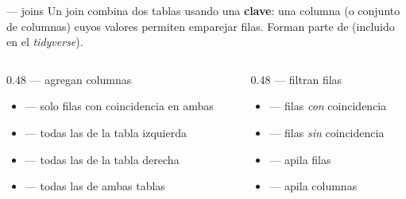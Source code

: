 \documentclass[8pt]{beamer}
\begin{document}
	\subtitle{Cheatsheet de \emph{joins} en R}

	\begin{frame}[plain]
		\maketitle
	\end{frame}

	\begin{frame}{ — joins}
		Un join combina dos tablas usando una \textbf{clave}: una columna (o conjunto de columnas) cuyos valores permiten emparejar filas. Forman parte de  (incluido en el \emph{tidyverse}).

		\begin{columns}[T]
			\begin{column}{0.48\linewidth}
				 — agregan columnas
				\begin{itemize}
					\item {} — solo filas con coincidencia en ambas
					\item {} — todas las de la tabla izquierda
					\item {} — todas las de la tabla derecha
					\item {} — todas las de ambas tablas
				\end{itemize}
			\end{column}
			\begin{column}{0.48\linewidth}
				 — filtran filas
				\begin{itemize}
					\item {} — filas \emph{con} coincidencia
					\item {} — filas \emph{sin} coincidencia
				\end{itemize}
				\begin{itemize}
					\item {} — apila filas
					\item {} — apila columnas
				\end{itemize}
			\end{column}
		\end{columns}
	\end{frame}
\end{document}
